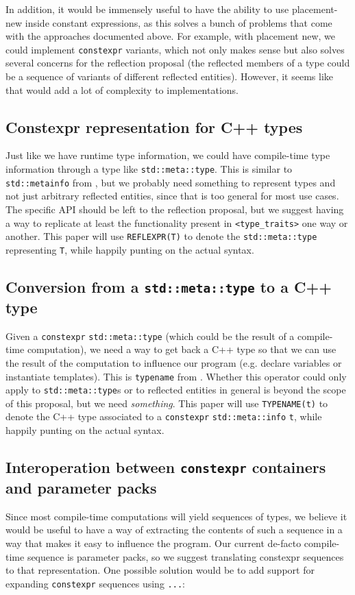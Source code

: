 \documentclass{wg21}
\newcommand{\cc}[1]{\texttt{#1}}
\begin{document}
In addition, it would be immensely useful to have the ability to use placement-new
inside constant expressions, as this solves a bunch of problems that come with
the approaches documented above. For example, with placement new, we could implement
\cc{constexpr} variants, which not only makes sense but also solves several
concerns for the reflection proposal (the reflected members of a type could be
a sequence of variants of different reflected entities). However, it seems like
that would add a lot of complexity to implementations.


\subsection{Constexpr representation for C++ types}
Just like we have runtime type information, we could have compile-time type
information through a type like \cc{std::meta::type}. This is similar to
\cc{std::metainfo} from \cite{P0598}, but we probably need something to
represent types and not just arbitrary reflected entities, since that is too
general for most use cases. The specific API should be left to the reflection
proposal, but we suggest having a way to replicate at least the functionality
present in \cc{<type_traits>} one way or another. This paper will use
\cc{REFLEXPR(T)} to denote the \cc{std::meta::type} representing \cc{T},
while happily punting on the actual syntax.


\subsection{Conversion from a \cc{std::meta::type} to a C++ type}
Given a \cc{constexpr} \cc{std::meta::type} (which could be the result of a
compile-time computation), we need a way to get back a C++ type so that we
can use the result of the computation to influence our program (e.g. declare
variables or instantiate templates). This is \cc{typename} from \cite{P0598}.
Whether this operator could only apply to \cc{std::meta::type}s or to reflected
entities in general is beyond the scope of this proposal, but we need
\textit{something}. This paper will use \cc{TYPENAME(t)} to denote the C++ type
associated to a \cc{constexpr} \cc{std::meta::info} \cc{t}, while happily
punting on the actual syntax.


\subsection{Interoperation between \cc{constexpr} containers and parameter packs}
Since most compile-time computations will yield sequences of types, we believe
it would be useful to have a way of extracting the contents of such a sequence
in a way that makes it easy to influence the program. Our current de-facto
compile-time sequence is parameter packs, so we suggest translating constexpr
sequences to that representation. One possible solution would be to add support
for expanding \cc{constexpr} sequences using \cc{...}:
\end{document}
